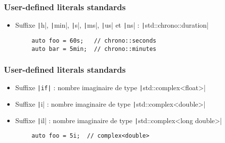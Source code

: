 \documentclass[C++.tex]{subfiles}
\begin{document}
\begin{frame}[fragile]
	\frametitle{User-defined literals standards}
	\begin{itemize}
		\item Suffixe \texttt|h|, \texttt|min|, \texttt|s|, \texttt|ms|, \texttt|us| et \texttt|ns| : \texttt|std::chrono::duration|
	\end{itemize}

	\begin{verbatim}
		auto foo = 60s;   // chrono::seconds
		auto bar = 5min;  // chrono::minutes
	\end{verbatim}
\end{frame}

\begin{frame}[fragile]
	\frametitle{User-defined literals standards}
	\begin{itemize}
		\item Suffixe \texttt{|if|} : nombre imaginaire de type \texttt|std::complex<float>|
		\item Suffixe \texttt|i| : nombre imaginaire de type \texttt|std::complex<double>|
		\item Suffixe \texttt|il| : nombre imaginaire de type \texttt|std::complex<long double>|
	\end{itemize}

	\begin{verbatim}
		auto foo = 5i;  // complex<double>
	\end{verbatim}
\end{frame}
\end{document}

